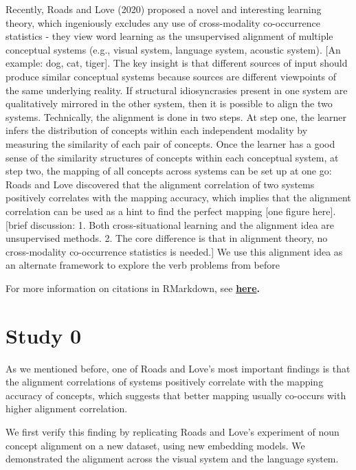 \documentclass[10pt, letterpaper]{article}
\begin{document}
Recently, Roads and Love (2020) proposed a novel and interesting
learning theory, which ingeniously excludes any use of cross-modality
co-occurrence statistics - they view word learning as the unsupervised
alignment of multiple conceptual systems (e.g., visual system, language
system, acoustic system). {[}An example: dog, cat, tiger{]}. The key
insight is that different sources of input should produce similar
conceptual systems because sources are different viewpoints of the same
underlying reality. If structural idiosyncrasies present in one system
are qualitatively mirrored in the other system, then it is possible to
align the two systems. Technically, the alignment is done in two steps.
At step one, the learner infers the distribution of concepts within each
independent modality by measuring the similarity of each pair of
concepts. Once the learner has a good sense of the similarity structures
of concepts within each conceptual system, at step two, the mapping of
all concepts across systems can be set up at one go: Roads and Love
discovered that the alignment correlation of two systems positively
correlates with the mapping accuracy, which implies that the alignment
correlation can be used as a hint to find the perfect mapping {[}one
figure here{]}. {[}brief discussion: 1. Both cross-situational learning
and the alignment idea are unsupervised methods. 2. The core difference
is that in alignment theory, no cross-modality co-occurrence statistics
is needed.{]} We use this alignment idea as an alternate framework to
explore the verb problems from before

For more information on citations in RMarkdown, see
\textbf{\href{http://rmarkdown.rstudio.com/authoring_bibliographies_and_citations.html\#citations}{here}.}

\hypertarget{study-0}{%
\section{Study 0}\label{study-0}}

As we mentioned before, one of Roads and Love's most important findings
is that the alignment correlations of systems positively correlate with
the mapping accuracy of concepts, which suggests that better mapping
usually co-occurs with higher alignment correlation.

We first verify this finding by replicating Roads and Love's experiment
of noun concept alignment on a new dataset, using new embedding models.
We demonstrated the alignment across the visual system and the language
system.
\end{document}
